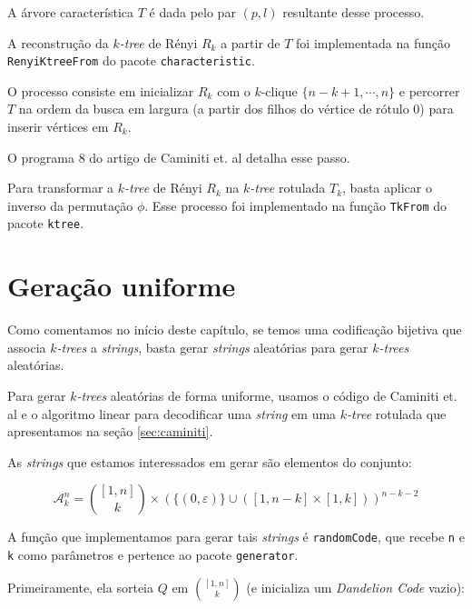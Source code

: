 \begin{algorithm}
\begin{step}
    A árvore característica $T$ é dada pelo par $(p, l)$ resultante desse processo.
  \end{step}

  \begin{step}
    A reconstrução da \emph{$k$-tree} de Rényi $R_k$ a partir de $T$ foi implementada na função {\tt RenyiKtreeFrom} do pacote {\tt characteristic}.

    O processo consiste em inicializar $R_k$ com o $k$-clique $\{ n-k+1, \cdots, n \}$ e percorrer $T$ na ordem da busca em largura (a partir dos filhos do vértice de rótulo $0$) para inserir vértices em $R_k$.

    O programa 8 do artigo de Caminiti et. al \cite{caminiti} detalha esse passo.
  \end{step}

  \begin{step}
    Para transformar a \emph{$k$-tree} de Rényi $R_k$ na \emph{$k$-tree} rotulada $T_k$, basta aplicar o inverso da permutação $\phi$. Esse processo foi implementado na função {\tt TkFrom} do pacote {\tt ktree}.
  \end{step}
\end{algorithm}

\section{Geração uniforme}
\label{sec:geracao}

Como comentamos no início deste capítulo, se temos uma codificação bijetiva que associa \emph{$k$-trees} a \emph{strings}, basta gerar \emph{strings} aleatórias para gerar \emph{$k$-trees} aleatórias.

Para gerar \emph{$k$-trees} aleatórias de forma uniforme, usamos o código de Caminiti et. al \cite{caminiti} e o algoritmo linear para decodificar uma \emph{string} em uma \emph{$k$-tree} rotulada que apresentamos na seção \ref{sec:caminiti}.

As \emph{strings} que estamos interessados em gerar são elementos do conjunto:

$$
\mathcal{A}^n_k = { [1,n] \choose k } \times (\{ ( 0, \varepsilon ) \} \cup ([1,n-k] \times [1,k]))^{n-k-2}
$$

A função que implementamos para gerar tais \emph{strings} é {\tt randomCode}, que recebe {\tt n} e {\tt k} como parâmetros e pertence ao pacote {\tt generator}.

Primeiramente, ela sorteia $Q$ em ${ [1,n] \choose k }$ (e inicializa um \emph{Dandelion Code} vazio):

